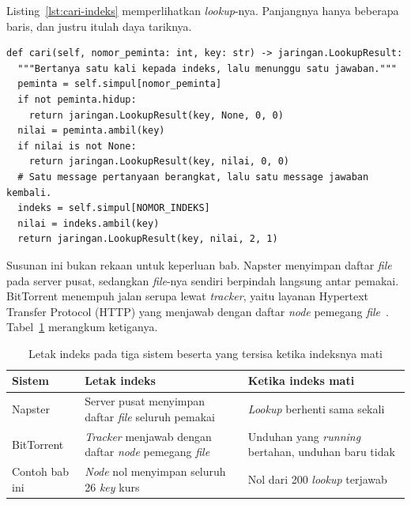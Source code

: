 Listing~\ref{lst:cari-indeks} memperlihatkan \textit{lookup}-nya. Panjangnya hanya
beberapa baris, dan justru itulah daya tariknya.

\begin{lstlisting}[style=PythonStyle, caption={\textit{Lookup} lewat
  \textit{centralized index}, tersedia di
  \berkas{sources/chapter07/indeks.py}}, label=lst:cari-indeks]
def cari(self, nomor_peminta: int, key: str) -> jaringan.LookupResult:
  """Bertanya satu kali kepada indeks, lalu menunggu satu jawaban."""
  peminta = self.simpul[nomor_peminta]
  if not peminta.hidup:
    return jaringan.LookupResult(key, None, 0, 0)
  nilai = peminta.ambil(key)
  if nilai is not None:
    return jaringan.LookupResult(key, nilai, 0, 0)
  # Satu message pertanyaan berangkat, lalu satu message jawaban kembali.
  indeks = self.simpul[NOMOR_INDEKS]
  nilai = indeks.ambil(key)
  return jaringan.LookupResult(key, nilai, 2, 1)
\end{lstlisting}

Susunan ini bukan rekaan untuk keperluan bab. Napster menyimpan daftar \textit{file}
pada server pusat, sedangkan \textit{file}-nya sendiri berpindah langsung antar
pemakai. BitTorrent menempuh jalan serupa lewat \textit{tracker}, yaitu layanan
Hypertext Transfer Protocol (HTTP) yang menjawab dengan daftar \textit{node} pemegang
\textit{file}~\cite{cohen2008bittorrent}. Tabel~\ref{tab:indeks-nyata} merangkum
ketiganya.

\begin{table}[htbp]
  \centering
  \caption{Letak indeks pada tiga sistem beserta yang tersisa ketika indeksnya
    mati}
  \label{tab:indeks-nyata}
  \begin{tabularx}{\textwidth}{|l|X|X|}
    \hline
    \textbf{Sistem} & \textbf{Letak indeks} & \textbf{Ketika indeks mati} \\
    \hline
    Napster & Server pusat menyimpan daftar \textit{file} seluruh pemakai & \textit{Lookup} berhenti sama sekali \\
    \hline
    BitTorrent & \textit{Tracker} menjawab dengan daftar \textit{node} pemegang \textit{file} & Unduhan yang \textit{running} bertahan, unduhan baru tidak \\
    \hline
    Contoh bab ini & \textit{Node} nol menyimpan seluruh 26 \textit{key} kurs & Nol dari 200 \textit{lookup} terjawab \\
    \hline
  \end{tabularx}
\end{table}

